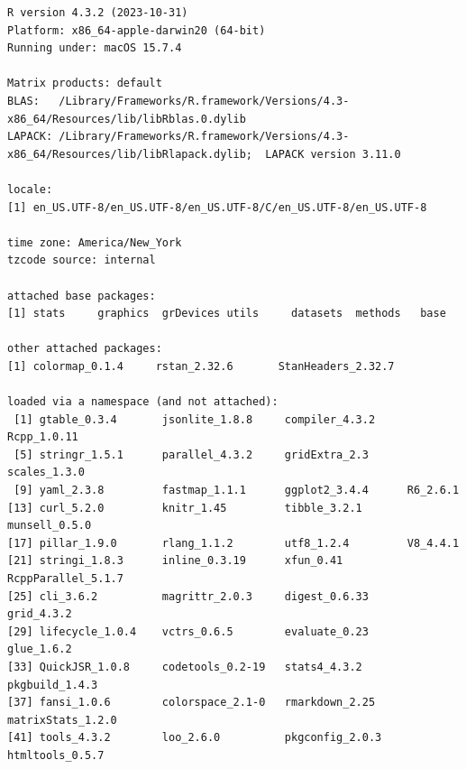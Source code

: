 \documentclass[
  letterpaper,
  DIV=11,
  numbers=noendperiod]{scrartcl}
\begin{document}
\begin{verbatim}
R version 4.3.2 (2023-10-31)
Platform: x86_64-apple-darwin20 (64-bit)
Running under: macOS 15.7.4

Matrix products: default
BLAS:   /Library/Frameworks/R.framework/Versions/4.3-x86_64/Resources/lib/libRblas.0.dylib 
LAPACK: /Library/Frameworks/R.framework/Versions/4.3-x86_64/Resources/lib/libRlapack.dylib;  LAPACK version 3.11.0

locale:
[1] en_US.UTF-8/en_US.UTF-8/en_US.UTF-8/C/en_US.UTF-8/en_US.UTF-8

time zone: America/New_York
tzcode source: internal

attached base packages:
[1] stats     graphics  grDevices utils     datasets  methods   base     

other attached packages:
[1] colormap_0.1.4     rstan_2.32.6       StanHeaders_2.32.7

loaded via a namespace (and not attached):
 [1] gtable_0.3.4       jsonlite_1.8.8     compiler_4.3.2     Rcpp_1.0.11       
 [5] stringr_1.5.1      parallel_4.3.2     gridExtra_2.3      scales_1.3.0      
 [9] yaml_2.3.8         fastmap_1.1.1      ggplot2_3.4.4      R6_2.6.1          
[13] curl_5.2.0         knitr_1.45         tibble_3.2.1       munsell_0.5.0     
[17] pillar_1.9.0       rlang_1.1.2        utf8_1.2.4         V8_4.4.1          
[21] stringi_1.8.3      inline_0.3.19      xfun_0.41          RcppParallel_5.1.7
[25] cli_3.6.2          magrittr_2.0.3     digest_0.6.33      grid_4.3.2        
[29] lifecycle_1.0.4    vctrs_0.6.5        evaluate_0.23      glue_1.6.2        
[33] QuickJSR_1.0.8     codetools_0.2-19   stats4_4.3.2       pkgbuild_1.4.3    
[37] fansi_1.0.6        colorspace_2.1-0   rmarkdown_2.25     matrixStats_1.2.0 
[41] tools_4.3.2        loo_2.6.0          pkgconfig_2.0.3    htmltools_0.5.7   
\end{verbatim}
\end{document}
